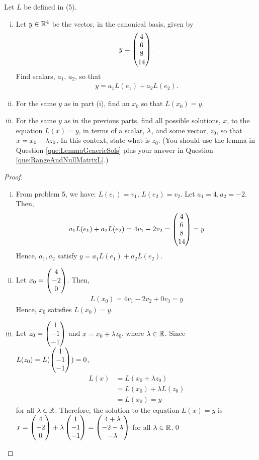\begin{question}
	\normalfont
	Let $L$ be defined in (5).
	
	\begin{enumerate}[(i)]
		
		
		\item Let $y\in{\mathbb R}^4$ be the vector, in the canonical basis, given by
		\begin{align*}
			y=\begin{pmatrix} 4\\ 6\\8 \\ 14\end{pmatrix}.
		\end{align*}
		Find scalars, $a_1$, $a_2$, so that
		\begin{align*}
			y= a_1L(e_1) + a_2 L(e_2).
		\end{align*}
		 
		\item For the same $y$ as in part (i), find an $x_0$ so that $L(x_0)=y$.
		\item For the same $y$ as in the previous parts, find all possible solutions, $x$, to the equation $L(x)=y$, in terms of a scalar, $\lambda$, and some vector, $z_0$, so that $x=x_0+\lambda z_0$.  In this context, state what is $z_0$.  (You should use the lemma in Question \ref{que:LemmaGenericSols} plus your answer in Question \ref{que:RangeAndNullMatrixL}.)  
	
	\end{enumerate}
\end{question}
\begin{proof}
    \renewcommand{\qedsymbol}{$\blacksquare$}
    \begin{enumerate}[(i)]
        \item From problem 5, we have: $L(e_1)=v_1$, $L(e_2)=v_2$.
        Let $a_1=4, a_2=-2$. Then, 
        \[
            \begin{aligned}
                a_1L(e_1)+a_2L(e_2)
                = 4v_1-2v_2
                = \begin{pmatrix} 4\\ 6\\8 \\ 14\end{pmatrix}=y
            \end{aligned}
        \]
        Hence, $a_1,a_2$ satisfy $y=a_1L(e_1)+a_2L(e_2)$.
        \item Let $x_0=\begin{pmatrix} 4\\ -2\\ 0\end{pmatrix}$. Then, 
        \[
            \begin{aligned}
                L(x_0)=4v_1-2v_2+0v_3=y
            \end{aligned}
        \]
        Hence, $x_0$ satisfies $L(x_0)=y$.
        \item Let $z_0=\begin{pmatrix} 1\\ -1\\ -1\end{pmatrix}$ and $x=x_0+\lambda z_0$, where $\lambda\in\mathbb R$. Since $L(z_0)=L(\begin{pmatrix} 1\\ -1\\ -1\end{pmatrix})=0$, 
        \[
            \begin{aligned}
                L(x)&=L(x_0+\lambda z_0)\\
                    &=L(x_0)+\lambda L(z_0)\\
                    &=L(x_0)=y
            \end{aligned}
        \]
        for all $\lambda\in\mathbb R$. Therefore, the solution to the equation $L(x)=y$ is $x=\begin{pmatrix} 4\\ -2\\ 0\end{pmatrix}+\lambda \begin{pmatrix} 1\\ -1\\ -1\end{pmatrix}=\begin{pmatrix} 4+\lambda\\ -2-\lambda\\ -\lambda\end{pmatrix}$ for all $\lambda\in\mathbb R$.\qed
    \end{enumerate}
    
    \renewcommand{\qedsymbol}{}
\end{proof}